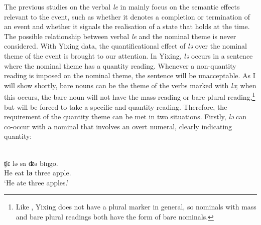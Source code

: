 \documentclass[output=paper]{langsci/langscibook}
\begin{document}
\begin{exe}
\ex {} \begin{xlist}


\end{xlist}
\end{exe}

The previous studies on the verbal \emph{le} in  mainly focus on the
semantic effects relevant to the event, such as whether it denotes a completion
or termination of an event and whether it signals the realisation of a state
that holds at the  time. The possible relationship between verbal
\emph{le} and the nominal theme is never considered. With Yixing data, the
quantificational effect of \emph{lə} over the nominal theme of the event is
brought to our attention. In Yixing, \emph{lə} occurs in a sentence where the
nominal theme has a quantity reading. Whenever a non-quantity reading is
imposed on the nominal theme, the sentence will be unacceptable. As I will show
shortly, bare nouns can be the theme of the verbs marked with \emph{lə}; when
this occurs, the bare noun will not have the mass reading or bare plural
reading,\footnote{Like , Yixing does not have a plural marker in
general, so nominals with mass and bare plural readings both have the form of
bare nominals.} but will be forced to take a specific and quantity reading.
Therefore, the requirement of the quantity theme can be met in two situations.
Firstly, \emph{lə} can co-occur with a nominal that involves an overt numeral,
clearly indicating quantity:

\begin{exe}
    \ex {}\\
    {ʧε} {lə} sa {ʣə} bɪŋgo. \\
    He eat \textbf{{lə}} three \Clf{} apple. \\
    \glt \enquote*{He ate three apples.}
\end{exe}
\end{document}
